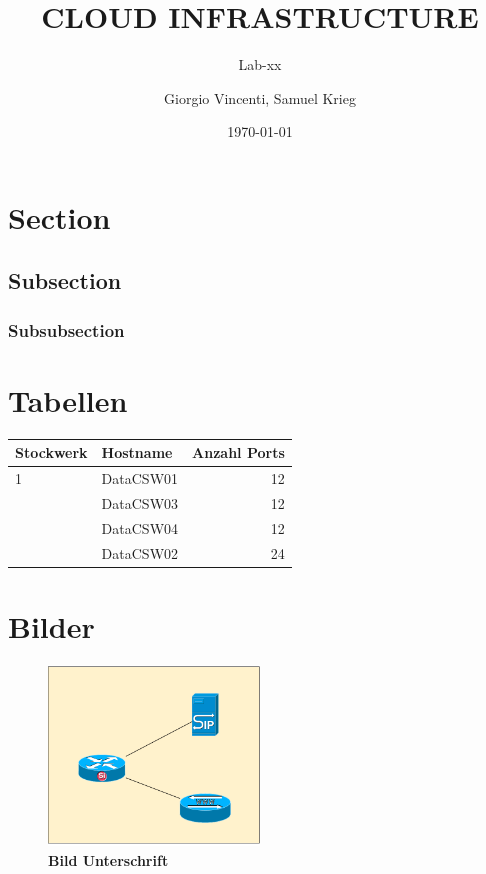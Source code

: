 \documentclass[a4,12pt]{scrartcl}
\title{CLOUD INFRASTRUCTURE}
\subtitle{Lab-xx}
\author{Giorgio Vincenti, Samuel Krieg}
\date{\today}
\begin{document}
\clearpage\maketitle
\thispagestyle{empty}
\tableofcontents
\newpage

\section{Section}
\lipsum[1]

\subsection{Subsection}
\lipsum[1]
\lipsum[1]
\lipsum[1]
\lipsum[1]
\lipsum[1]

\subsubsection{Subsubsection}
\lipsum[1]

\section{Tabellen}
\begin{center}
    \begin{tabular}{@{} l l r@{}}\toprule    
    {Stockwerk} & {Hostname} & {Anzahl Ports}\\ \midrule
    1 & DataCSW01 & 12\\ \addlinespace
    & DataCSW03 & 12\\ \addlinespace
    & DataCSW04 & 12\\ \addlinespace
    2& DataCSW02 & 24\\
    \bottomrule
    \end{tabular}
\end{center}

\section{Bilder}
\begin{figure} [H]
	\begin{center}
	\includegraphics[width=0.50\textwidth]{./pictures/sample_picture.pdf}
	\caption{\textbf{Bild Unterschrift}}
	\label{Bild Referenz}
	\end{center}
\end{figure}
\end{document}
